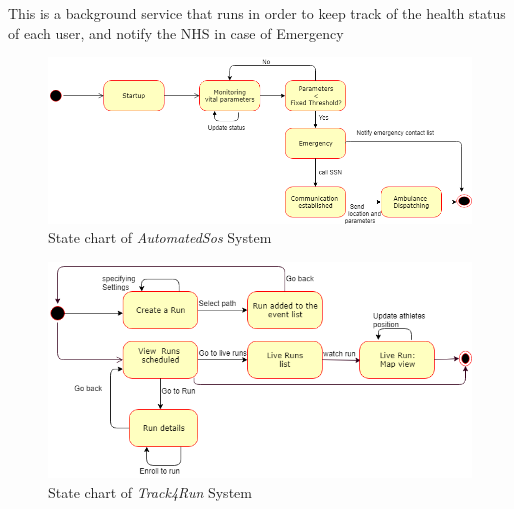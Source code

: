 This is a background service that runs in order to keep track of the health status of each user, and notify the NHS in case of Emergency 
\begin{figure}[H]
    \centering
    \includegraphics[scale=0.4]{Pictures/stateChart2.png}
    \caption{State chart of \emph{AutomatedSos} System}
\end{figure}
\begin{figure}[H]
    \centering
    \includegraphics[scale=0.4]{Pictures/statechart3.png}
    \caption{State chart  of \emph{Track4Run} System}
\end{figure}